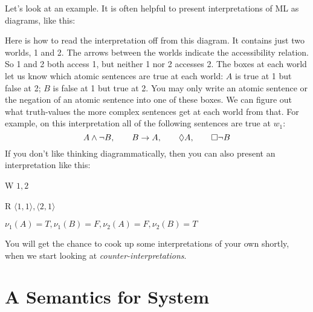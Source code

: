 Let's look at an example. It is often helpful to present interpretations of ML as diagrams, like this:
\begin{center}
	\begin{bmlimage}
\end{bmlimage}
\end{center}
Here is how to read the interpretation off from this diagram. It contains just two worlds, 1 and 2. The arrows between the worlds indicate the accessibility relation. So 1 and 2 both access 1, but neither 1 nor 2 accesses 2. The boxes at each world let us know which atomic sentences are true at each world: $A$ is true at 1 but false at 2; $B$ is false at 1 but true at 2. You may only write an atomic sentence or the negation of an atomic sentence into one of these boxes. We can figure out what truth-values the more complex sentences get at each world from that. For example, on this interpretation all of the following sentences are true at $w_1$:
\[
A\wedge\neg B,\qquad B\rightarrow A,\qquad \Diamond A,\qquad \Box\neg B
\]
If you don't like thinking diagrammatically, then you can also present an interpretation like this:
\begin{ekey}
	\item[W]$1,2$
	\item[R]$\langle 1,1\rangle, \langle 2,1\rangle$
	\item[\nu]$\nu_{1}(A)=T, \nu_{1}(B)=F, \nu_{2}(A)=F, \nu_{2}(B)=T$
\end{ekey}
You will get the chance to cook up some interpretations of your own shortly, when we start looking at \emph{counter-interpretations}.

\section{A Semantics for System \mlK}
\label{SemanticsK}

